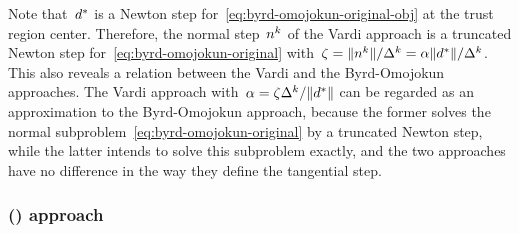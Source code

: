 Note that~$\step[\ast]$ is a Newton step for~\cref{eq:byrd-omojokun-original-obj} at the trust region center.
Therefore, the normal step~$\nstep[k]$ of the Vardi approach is a truncated Newton step for~\cref{eq:byrd-omojokun-original} with~$\zeta = \norm{\nstep[k]} / \rad[k]  = \alpha \norm{\step[\ast]} / \rad[k]$.
This also reveals a relation between the Vardi and the Byrd-Omojokun approaches.
The Vardi approach with~$\alpha = \zeta \rad[k] / \norm{\step[\ast]}$ can be regarded as an approximation to the Byrd-Omojokun approach, because the former solves the normal subproblem~\cref{eq:byrd-omojokun-original} by a truncated Newton step, while the latter intends to solve this subproblem exactly, and the two approaches have no difference in the way they define the tangential step.

\subsubsection{ () approach}

